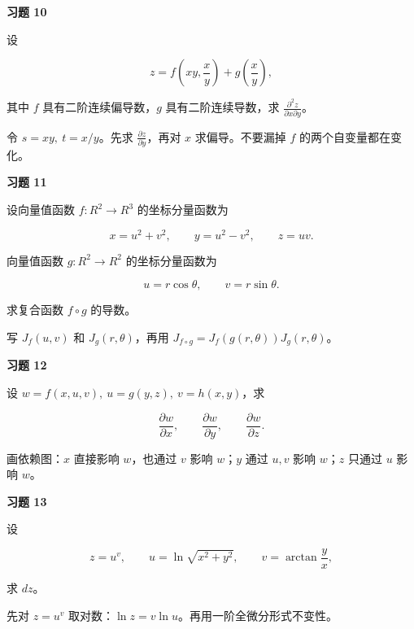 \begin{exercisebox}
\textbf{习题 10}

设

\[
        z=f\left(xy,\frac{x}{y}\right)+g\left(\frac{x}{y}\right),
      \]

其中 \(f\) 具有二阶连续偏导数，\(g\) 具有二阶连续导数，求 \(\frac{\partial^2 z}{\partial x\partial y}\)。

\begin{hintbox}
令 \(s=xy,\ t=x/y\)。先求 \(\frac{\partial z}{\partial y}\)，再对 \(x\) 求偏导。不要漏掉 \(f\) 的两个自变量都在变化。
\end{hintbox}
\end{exercisebox}

\begin{exercisebox}
\textbf{习题 11}

设向量值函数 \(f:R^2\to R^3\) 的坐标分量函数为

\[
        x=u^2+v^2,\qquad
        y=u^2-v^2,\qquad
        z=uv.
      \]

向量值函数 \(g:R^2\to R^2\) 的坐标分量函数为

\[
        u=r\cos\theta,\qquad v=r\sin\theta.
      \]

求复合函数 \(f\circ g\) 的导数。

\begin{hintbox}
写 \(J_f(u,v)\) 和 \(J_g(r,\theta)\)，再用 \(J_{f\circ g}=J_f(g(r,\theta))J_g(r,\theta)\)。
\end{hintbox}
\end{exercisebox}

\begin{exercisebox}
\textbf{习题 12}

设 \(w=f(x,u,v),\ u=g(y,z),\ v=h(x,y)\)，求

\[
        \frac{\partial w}{\partial x},\qquad
        \frac{\partial w}{\partial y},\qquad
        \frac{\partial w}{\partial z}.
      \]

\begin{hintbox}
画依赖图：\(x\) 直接影响 \(w\)，也通过 \(v\) 影响 \(w\)；\(y\) 通过 \(u,v\) 影响 \(w\)；\(z\) 只通过 \(u\) 影响 \(w\)。
\end{hintbox}
\end{exercisebox}

\begin{exercisebox}
\textbf{习题 13}

设

\[
        z=u^v,\qquad
        u=\ln\sqrt{x^2+y^2},\qquad
        v=\arctan\frac{y}{x},
      \]

求 \(dz\)。

\begin{hintbox}
先对 \(z=u^v\) 取对数：\(\ln z=v\ln u\)。再用一阶全微分形式不变性。
\end{hintbox}
\end{exercisebox}

